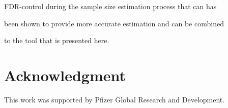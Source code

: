 \documentclass[12pt]{article}
\begin{document}
FDR-control during the sample size estimation process that can has

been shown to provide more accurate estimation and can be combined

to the tool that is presented here.





\section*{Acknowledgment}



This work was supported by Pfizer Global Research and Development.




\end{document}
